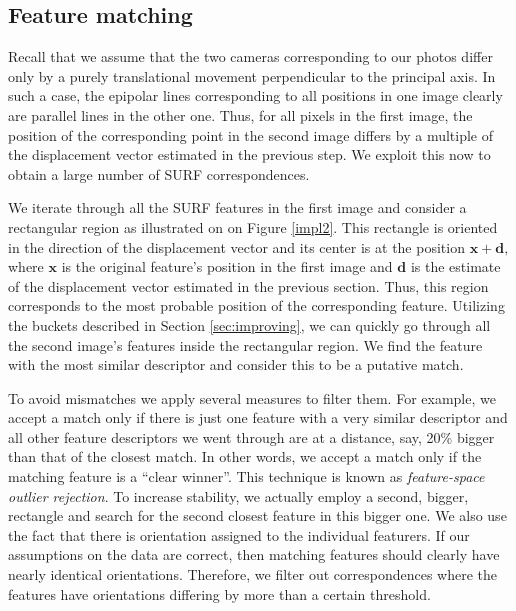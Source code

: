 \subsection{Feature matching}

Recall that we assume that the two cameras corresponding to our photos differ only by a purely translational movement perpendicular to the principal axis.
In such a case, the epipolar lines corresponding to all positions in one image clearly are parallel lines in the other one. 
Thus, for all pixels in the first image, the position of the corresponding point in the second image differs by a multiple of the displacement vector estimated in the previous step. 
We exploit this now to obtain a large number of SURF correspondences. 

We iterate through all the SURF features in the first image and consider a rectangular region as illustrated on on Figure \ref{impl2}.
This rectangle is oriented in the direction of the displacement vector and its center is at the position $\mathbf{x} + \mathbf{d},$ where $\mathbf{x}$ is the original feature's position in the first image and $\mathbf{d}$ is the estimate of the displacement vector estimated in the previous section. 
Thus, this region corresponds to the most probable position of the corresponding feature. 
Utilizing the buckets described in Section \ref{sec:improving}, we can quickly go through all the second image's features inside the rectangular region. 
We find the feature with the most similar descriptor and consider this to be a putative match.

To avoid mismatches we apply several measures to filter them. 
For example, we accept a match only if there is just one feature with a very similar descriptor and all other feature descriptors we went through are at a distance, say, 20\% bigger than that of the closest match. 
In other words, we accept a match only if the matching feature is a ``clear winner''.
This technique is known as \textit{feature-space outlier rejection}.
To increase stability, we actually employ a second, bigger, rectangle and search for the second closest feature in this bigger one.
We also use the fact that there is orientation assigned to the individual featurers. 
If our assumptions on the data are correct, then matching features should clearly have nearly identical orientations. 
Therefore, we filter out correspondences where the features have orientations differing by more than a certain threshold. 


